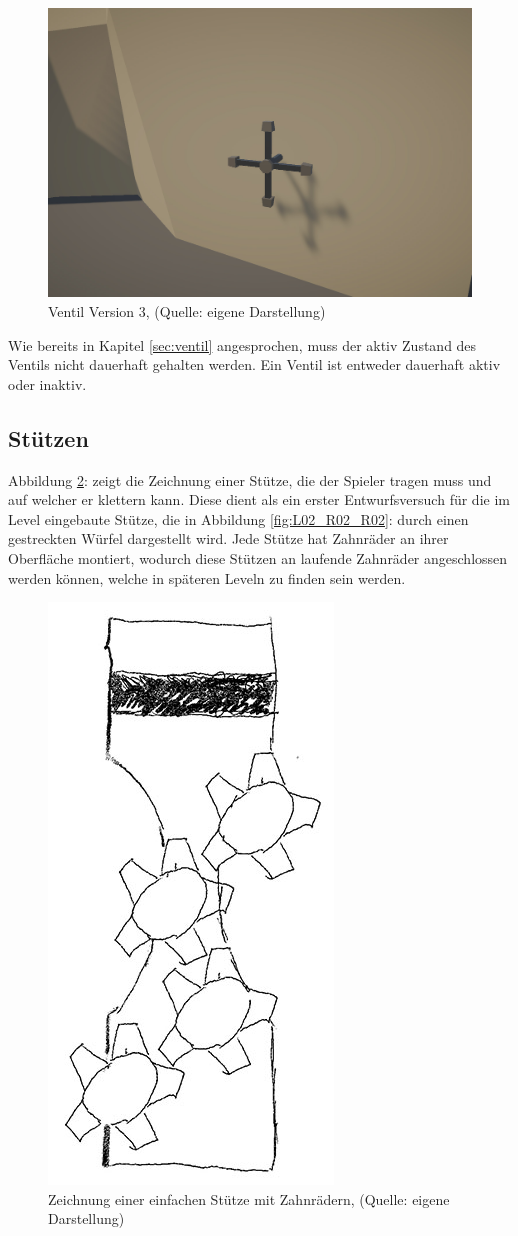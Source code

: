 \begin{figure}[ht]
\centering
\includegraphics[width=0.8\linewidth]{content/pictures/Vault_03.jpg}
\caption{Ventil Version 3, (Quelle: eigene Darstellung)}
\label{fig:valve_03}
\end{figure}

Wie bereits in Kapitel \ref{sec:ventil}  angesprochen, muss der aktiv Zustand des Ventils nicht dauerhaft gehalten werden. Ein Ventil ist entweder dauerhaft aktiv oder inaktiv.

\subsection{Stützen}
Abbildung \ref{fig:stuetze_01}:  zeigt die Zeichnung einer Stütze, die der Spieler tragen muss und auf welcher er klettern kann. Diese dient als ein erster Entwurfsversuch für die im Level eingebaute Stütze, die in Abbildung \ref{fig:L02_R02_R02}:  durch einen gestreckten Würfel dargestellt wird. Jede Stütze hat Zahnräder an ihrer Oberfläche montiert, wodurch diese Stützen an laufende Zahnräder angeschlossen werden können, welche in späteren Leveln zu finden sein werden.
\begin{figure}[ht]
\centering
\includegraphics[width=0.2\linewidth]{content/pictures/Stuetze_01.jpg}
\caption{Zeichnung einer einfachen Stütze mit Zahnrädern, (Quelle: eigene Darstellung)}
\label{fig:stuetze_01}
\end{figure}

